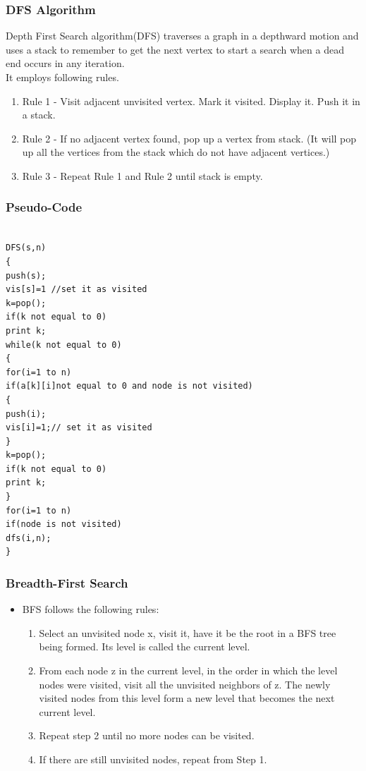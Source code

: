\documentclass{beamer}
\begin{document}
\begin{frame}
\frametitle{DFS Algorithm}
Depth First Search algorithm(DFS) traverses a graph in a depthward motion and uses a stack to remember to get the next vertex to start a search when a dead end occurs in any iteration.\\
It employs following rules.
\begin{enumerate}
\item     Rule 1 - Visit adjacent unvisited vertex. Mark it visited. Display it. Push it in a stack.

\item    Rule 2 - If no adjacent vertex found, pop up a vertex from stack. (It will pop up all the vertices from the stack which do not have adjacent vertices.)

\item    Rule 3 - Repeat Rule 1 and Rule 2 until stack is empty.
\end{enumerate}
\end{frame}



\begin{frame}[fragile]
\frametitle{Pseudo-Code}

\begin{lstlisting}

DFS(s,n)
{
push(s);
vis[s]=1 //set it as visited
k=pop();
if(k not equal to 0)
print k;
while(k not equal to 0)
{
for(i=1 to n)
if(a[k][i]not equal to 0 and node is not visited)
{
push(i);
vis[i]=1;// set it as visited
}
k=pop();
if(k not equal to 0)
print k;
}
for(i=1 to n)
if(node is not visited)
dfs(i,n);
}

\end{lstlisting}

\end{frame}


\begin{frame}
\frametitle{Breadth-First Search}
\begin{itemize}
\item BFS follows the following rules: 
\begin{enumerate}
\item Select an unvisited node x, visit it, have it be the root in a BFS tree being formed. Its level is called the current level. 
\item From each node z in the current level, in the order in which the level nodes were visited, visit all the unvisited neighbors of z. The newly visited nodes from this level form a new level that becomes the next current level. 
\item Repeat step 2 until no more nodes can be visited. 
\item If there are still unvisited nodes, repeat from Step 1.
\end{enumerate}
\end{itemize}

\end{frame}
\end{document}
